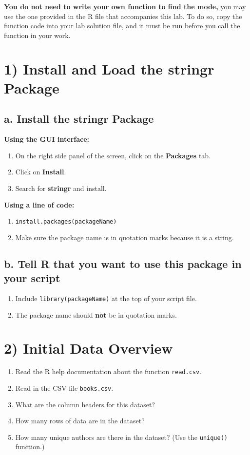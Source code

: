 \documentclass{article}
\begin{document}
\textbf{You do not need to write your own function to find the mode,} you may use the one provided in the R file that accompanies this lab. To do so, copy the function code into your lab solution file, and it must be run before you call the function in your work.

\section*{1) Install and Load the stringr Package}
\subsection*{a. Install the stringr Package}
\textbf{Using the GUI interface:}
\begin{enumerate}
    \item On the right side panel of the screen, click on the \textbf{Packages} tab.
    \item Click on \textbf{Install}.
    \item Search for \textbf{stringr} and install.
\end{enumerate}
\textbf{Using a line of code:}
\begin{enumerate}
    \item \texttt{install.packages(packageName)}
    \item Make sure the package name is in quotation marks because it is a string.
\end{enumerate}

\subsection*{b. Tell R that you want to use this package in your script}
\begin{enumerate}
    \item Include \texttt{library(packageName)} at the top of your script file.
    \item The package name should \textbf{not} be in quotation marks.
\end{enumerate}

\section*{2) Initial Data Overview}
\begin{enumerate}
    \item Read the R help documentation about the function \texttt{read.csv}.
    \item Read in the CSV file \texttt{books.csv}.
    \item What are the column headers for this dataset?
    \item How many rows of data are in the dataset?
    \item How many unique authors are there in the dataset? (Use the \texttt{unique()} function.)
\end{enumerate}
\end{document}
